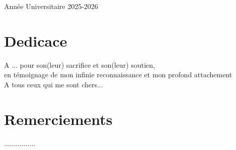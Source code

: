 \documentclass[a4paper, oneside, 12pt, final]{extreport}
\begin{document}
\vfill %
\begin{center}
    \vspace{1.5cm}
    {\large Année Universitaire 2025-2026 \par} %
\end{center}


\chapter*{Dedicace}
\thispagestyle{empty}

  

\begin{center}
{\it 
	
A ... pour son(leur) sacrifice et son(leur) soutien, \\
en témoignage de mon infinie reconnaissance et mon profond attachement \\
\vspace{1cm}
A tous ceux qui me sont chers...

}
\end{center}
 
\chapter*{Remerciements}
 
\thispagestyle{empty}
 
................ 


\tableofcontents
 

\listoffigures
 
\listoftables
 
\listofalgorithms
{}
 



\printglossaries
 
\end{document}

